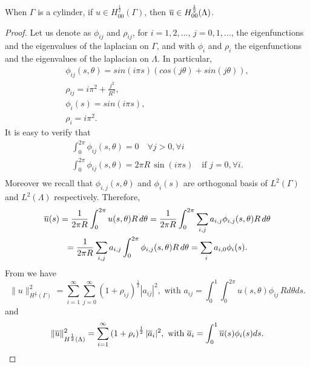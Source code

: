 \begin{lemma}\label{lemma:H12norm}
When $\Gamma$ is a cylinder, if $u\in H_{00}^{\frac 12}(\Gamma)$, then $\overline{u}\in H_{00}^{\frac 12}(\Lambda)$.
\end{lemma}
\begin{proof}
Let us denote as $\phi _{ij}$ and $\rho _{ij}$, for $i=1,2,\dots$, $j=0,1,\dots$, the eigenfunctions and the eigenvalues of the laplacian on $\Gamma$, and with $\phi _i$ and $\rho _i$ the eigenfunctions and the eigenvalues of the laplacian on $\Lambda$. In particular,
\begin{align*}
\phi _{ij}(s,\theta)=sin (i\pi s)\left( cos(j\theta)+ sin(j\theta) \right),\\
\rho_{ij}=i\pi ^2+\frac{j^2}{R^2},\\
\phi _{i}(s)=sin (i\pi s),\\
\rho _i = i\pi ^2.
\end{align*}
It is easy to verify that 
\begin{eqnarray}
\label{null_int_eigenf}
\int_0^{2\pi} \phi _{ij}(s,\theta)=0 \quad \forall j>0, \forall i \\
\label{nonull_int_eigenf}
\int_0^{2\pi} \phi _{ij}(s,\theta)= 2\pi R \, \sin(i \pi s) \quad \mbox{if } j=0, \forall i  .\\
\end{eqnarray}
Moreover we recall that $\phi_{i,j}(s,\theta)$ and $\phi _i(s)$ are orthogonal basis of $L^2(\Gamma)$ and $L^2(\Lambda)$ respectively. Therefore,
\begin{multline*}
\overline{u}(s)=\frac{1}{2\pi R}\int_0^{2\pi} u(s,\theta)R\, d\theta
= \frac{1}{2\pi R}\int_0^{2\pi} \sum_{i,j} a_{i,j} \phi_{i,j}(s,\theta) R\, d\theta
\\= \frac{1}{2\pi R}\sum_{i,j} a_{i,j}\int_0^{2\pi}  \phi_{i,j}(s,\theta) R\, d\theta
=  \sum_{i} a_{i,0} \phi_{i}(s).
\end{multline*}
From \cite[Lemma 4.11]{c-w_h_m_2015} we have
\begin{equation}\label{H12norm_Gamma}
\|u\|^2_{H^{\frac 12}(\Gamma)}=\sum_{i=1}^{\infty}\sum_{j=0}^{\infty} \left( 1+ \rho_{ij}\right)^{\frac 12}|a_{ij}|^2,
\text{ with }
a_{ij}=\int _0^1\int _0^{2\pi} u(s,\theta )\phi_{ij}\, R d\theta ds.
\end{equation}
and 
\begin{equation*}
\|\overline{u}\|^2_{H^{\frac 12}(\Lambda)}=\sum_{i=1}^{\infty} \left( 1+ \rho_{i}\right)^{\frac 12}|\overline{a}_i|^2,
\text{ with }
\overline{a}_i=\int _0^1 \overline{u}(s )\phi_{i}(s) ds.
\end{equation*}


\end{proof}
